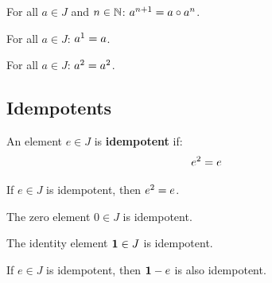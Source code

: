 \begin{lemma}
For all $a \in J$ and $n \in \mathbb{N}$: $a^{n+1} = a \circ a^{n}$.
\end{lemma}

\begin{lemma}
For all $a \in J$: $a^{1} = a$.
\end{lemma}

\begin{lemma}
For all $a \in J$: $a^{2} = a^{2}$.
\end{lemma}

\subsection{Idempotents}

\begin{definition}[IsIdempotent]
An element $e \in J$ is \textbf{idempotent} if:
\[ e^{2} = e \]
\end{definition}

\begin{lemma}
If $e \in J$ is idempotent, then $e^{2} = e$.
\end{lemma}

\begin{theorem}
The zero element $0 \in J$ is idempotent.
\end{theorem}

\begin{theorem}
The identity element $\mathbf{1} \in J$ is idempotent.
\end{theorem}

\begin{theorem}
If $e \in J$ is idempotent, then $\mathbf{1} - e$ is also idempotent.
\end{theorem}

